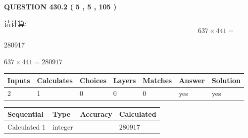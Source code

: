 \documentclass{ctexart}
\begin{document}
   
  
\vspace{0.2in}
  
{\textbf{\Large{QUESTION
430.2 
 ( 5 , 5 , 105 )
}}}
  
  
 
请计算:
\begin{equation}
637  \times    %
441 = \nonumber
\end{equation}
 
 
 
\noindent{}
 
 

280917
 
 
\noindent{}
 
 

 
 
 
\noindent{}
 
 

$ %
637 \times  %
441=   %
280917$
 
 
\noindent{}
 
 

 
   
   
   
   
\noindent\begin{tabular}{|l|l|l|l|l|l|l|}
 \hline
Inputs & Calculates & Choices & Layers & Matches & Answer & Solution \\ \hline
 2  & 
 1  & 
 0
  & 
 0  & 
 0  & 
  yes & 
  yes 
  \\ \hline
 \end{tabular}
   
   
   
   
\noindent{}
   
   
  
  
\noindent\begin{tabular}{|l|l|l|l|}
\hline
 Sequential & Type & Accuracy & Calculated \\ 
\hline
 
 
  Calculated $  1 $ & integer &  & 
  $ 280917 $ 
 \\  \hline  
 \end{tabular}
   
\end{document}
